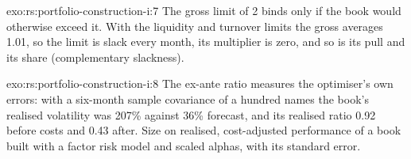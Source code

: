 \begin{solution}{exo:rs:portfolio-construction-i:7}
The gross limit of 2 binds only if the book would otherwise exceed it. With the liquidity and turnover limits the gross averages 1.01, so the limit is slack every
month, its multiplier is zero, and so is its pull and its share (complementary slackness).
\end{solution}

\begin{solution}{exo:rs:portfolio-construction-i:8}
The ex-ante ratio measures the optimiser's own errors: with a six-month sample covariance of a hundred names the book's realised volatility was 207\% against 36\%
forecast, and its realised ratio 0.92 before costs and 0.43 after. Size on realised, cost-adjusted performance of a book built with a factor risk model and scaled
alphas, with its standard error.
\end{solution}

